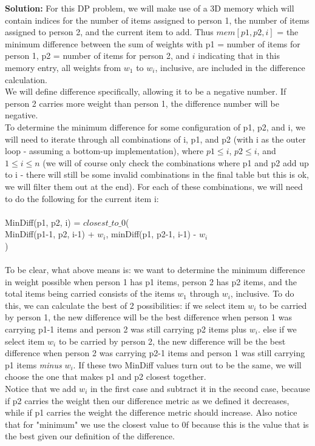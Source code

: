 \documentclass[10pt]{article}
\newcommand{\solution}[1]{\color{blue}\hfill\break\noindent\textbf{Solution:} #1\color{black}}
\begin{document}
\solution{
    For this DP problem, we will make use of a 3D memory which will contain indices for the number of items assigned to person 1, the number of items assigned to person 2, and the current item to add.
    Thus $mem[p1, p2, i]$ = the minimum difference between the sum of weights with p1 = number of items for person 1, p2 = number of items for person 2, and $i$ indicating that in this memory entry, all weights from $w_1$ to $w_i$, inclusive, are included in the difference calculation.\\
    We will define difference specifically, allowing it to be a negative number. If person 2 carries more weight than person 1, the difference number will be negative. \\
    To determine the minimum difference for some configuration of p1, p2, and i, we will need to iterate through all combinations of i, p1, and p2 (with i as the outer loop - assuming a bottom-up implementation), where $p1 \leq i$, $p2 \leq i$, and $1 \leq i \leq n$ (we will of course only check the combinations where p1 and p2 add up to i - there will still be some invalid combinations in the final table but this is ok, we will filter them out at the end). For each of these combinations, we will need to do the following for the current item i: \\ \\
    MinDiff(p1, p2, i) = $closest\_to\_0$( \\
    \null \quad MinDiff(p1-1, p2, i-1) + $w_i$, minDiff(p1, p2-1, i-1) - $w_i$  \\ 
    ) \\ \\
    To be clear, what above means is: we want to determine the minimum difference in weight possible when person 1 has p1 items, person 2 has p2 items, and the total items being carried consists of the items $w_1$ through $w_i$, inclusive. To do this, we can calculate the best of 2 possibilities: if we select item $w_i$ to be carried by person 1, the new difference will be the best difference when person 1 was carrying p1-1 items and person 2 was still carrying p2 items plus $w_i$. else if we select item $w_i$ to be carried by person 2, the new difference will be the best difference when person 2 was carrying p2-1 items and person 1 was still carrying p1 items \emph{minus} $w_i$. If these two MinDiff values turn out to be the same, we will choose the one that makes p1 and p2 closest together. \\
    Notice that we add $w_i$ in the first case and subtract it in the second case, because if p2 carries the weight then our difference metric as we defined it decreases, while if p1 carries the weight the difference metric should increase. Also notice that for "minimum" we use the closest value to $0$f because this is the value that is the best given our definition of the difference.\\
}
\end{document}
